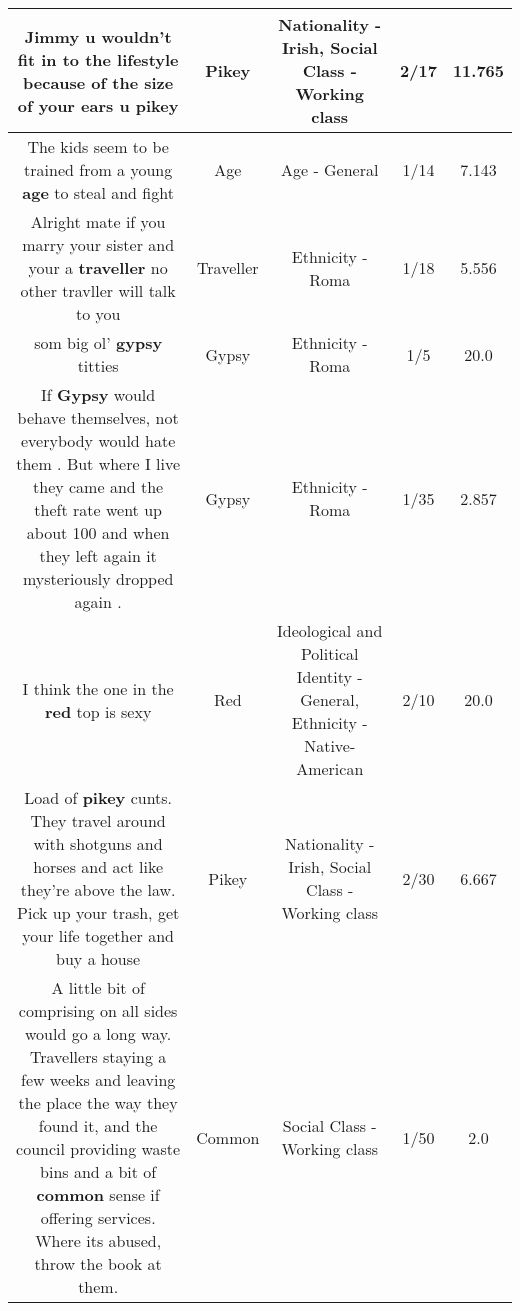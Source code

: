 \documentclass[11pt]{article}
\newlength\mylength
\begin{document}
\begin{center}
\begin{longtable}{|C{.65\mylength}|C{.30\mylength}|C{.12\mylength}|C{.12\mylength}|C{.12\mylength}|}
  \small Jimmy u wouldn't fit in to the lifestyle because of the size of your ears u pikey\normalsize   & Pikey & Nationality - Irish, Social Class - Working class & 2/17 & 11.765 \\  \hline
  \small The kids seem to be trained from a young \textbf{age} to steal and fight\normalsize   & Age & Age - General & 1/14 & 7.143 \\  \hline
  \small Alright mate if you marry your sister and your a \textbf{traveller} no other travller will talk to you\normalsize   & Traveller & Ethnicity - Roma & 1/18 & 5.556 \\  \hline
  \small som big ol' \textbf{gypsy} titties\normalsize   & Gypsy & Ethnicity - Roma & 1/5 & 20.0 \\  \hline
  \small If \textbf{Gypsy} would behave themselves, not everybody would hate them . But where I live they came and the theft rate went up about 100 and when they left again it mysteriously dropped again .\normalsize   & Gypsy & Ethnicity - Roma & 1/35 & 2.857 \\  \hline
  \small I think the one in the \textbf{r\textbf{ed}} top is sexy\normalsize   & Red &  Ideological and Political Identity - General, Ethnicity - Native-American & 2/10 & 20.0 \\  \hline
  \small Load of \textbf{p\textbf{ikey}} cunts. They travel around with shotguns and horses and act like they're above the law. Pick up your trash, get your life together and buy a house\normalsize   & Pikey & Nationality - Irish, Social Class - Working class & 2/30 & 6.667 \\  \hline
  \small A little bit of comprising on all sides would go a long way. Travellers staying a few weeks and leaving the place the way they found it, and the council providing waste bins and a bit of \textbf{common} sense if offering services. Where its abused, throw the book at them.\normalsize   & Common & Social Class - Working class & 1/50 & 2.0 \\  \hline

\end{longtable}
\end{center}
\end{document}
